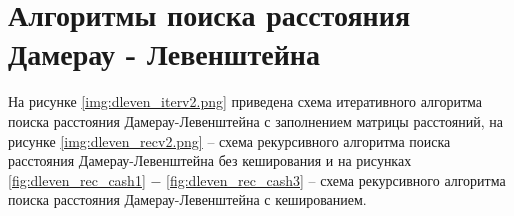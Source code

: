 \section{Алгоритмы поиска расстояния Дамерау - Левенштейна}
На рисунке \ref{img:dleven_iterv2.png} приведена схема итеративного алгоритма поиска расстояния Дамерау-Левенштейна с заполнением матрицы расстояний, на рисунке \ref{img:dleven_recv2.png} -- схема рекурсивного алгоритма поиска расстояния Дамерау-Левенштейна без кеширования и на рисунках \ref{fig:dleven_rec_cash1} $-$ \ref{fig:dleven_rec_cash3} -- схема рекурсивного алгоритма поиска расстояния Дамерау-Левенштейна с кешированием.
\\
\\
\\
\\
\\
\\
\\
\\
\\
\\
\\
\\
\\
\\
\\
\\
\\
\\
\\
\\
\\
\\
\\


